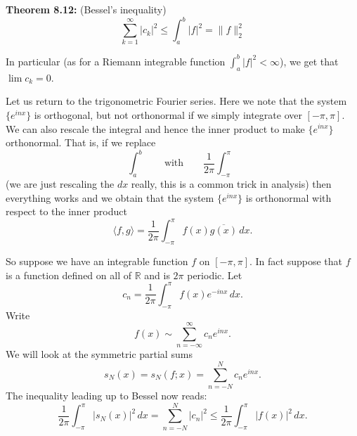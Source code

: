 \documentclass[12pt]{book}
\newcommand{\snorm}[1]{\lVert {#1} \rVert}
\newcommand{\abs}[1]{\left\lvert {#1} \right\rvert}
\newcommand{\R}{{\mathbb{R}}}
\theoremstyle{plain}
\theoremstyle{remark}
\theoremstyle{definition}
\theoremstyle{exercise}
\theoremstyle{example}
\begin{document}
\medskip

\textbf{Theorem 8.12:} (Bessel's inequality)
$$
\sum_{k=1}^\infty \abs{c_k}^2
\leq
\int_a^b \abs{f}^2
= \snorm{f}_2^2
$$

\medskip

In particular (as for a Riemann integrable function
$\int_a^b \abs{f}^2 < \infty$), we get that $\lim c_k = 0$.

\medskip

Let us return to the trigonometric Fourier series.  Here we note that the
system $\{ e^{inx} \}$ is orthogonal, but not orthonormal if we simply
integrate over $[-\pi,\pi]$.  We can also rescale the integral
and hence the inner product to make 
$\{ e^{inx} \}$ orthonormal.  That is, if we replace
$$
\int_a^b \qquad \text{with} \qquad
\frac{1}{2\pi} \int_{-\pi}^\pi
$$
(we are just rescaling the $dx$ really, this is a common trick in analysis)
then everything works and we obtain that the system $\{ e^{inx}
\}$ is orthonormal with respect to the inner product
$$
\langle f , g \rangle =
\frac{1}{2\pi} \int_{-\pi}^\pi f(x) \overline{g(x)} \, dx .
$$

So suppose we have an integrable function $f$ on $[-\pi,\pi]$.  In fact
suppose
that $f$ is a function defined on all of $\R$ and is $2\pi$ periodic.
Let
$$
c_n = 
\frac{1}{2\pi} \int_{-\pi}^\pi
f(x) e^{-inx} \, dx .
$$
Write
$$
f(x) \sim
\sum_{n=-\infty}^\infty c_n e^{inx} .
$$
We will look at the symmetric partial sums
$$
s_N(x) = s_N(f;x) = 
\sum_{n=-N}^N c_n e^{inx} .
$$
The inequality leading up to Bessel now reads:
$$
\frac{1}{2\pi} \int_{-\pi}^\pi
\abs{s_N(x)}^2 \, dx =
\sum_{n=-N}^N \abs{c_n}^2
\leq
\frac{1}{2\pi} \int_{-\pi}^\pi
\abs{f(x)}^2
\, dx .
$$
\end{document}
